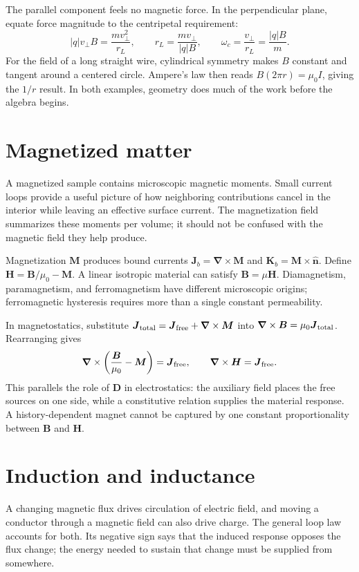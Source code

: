 \documentclass[11pt,oneside]{book}
\newcommand{\vect}[1]{\boldsymbol{#1}}
\newcommand{\grad}{\boldsymbol{\nabla}}
\newcommand{\mun}{\mu_0}
\theoremstyle{reviewstyle}
\begin{document}
The parallel component feels no magnetic force. In the perpendicular plane, equate force magnitude to the centripetal requirement:
\begin{equation}
|q|v_\perp B=\frac{mv_\perp^2}{r_L},\qquad
r_L=\frac{mv_\perp}{|q|B},\qquad
\omega_c=\frac{v_\perp}{r_L}=\frac{|q|B}{m}.
\end{equation}
For the field of a long straight wire, cylindrical symmetry makes $B$ constant and tangent around a centered circle. Ampere's law then reads $B(2\pi r)=\mun I$, giving the $1/r$ result. In both examples, geometry does much of the work before the algebra begins.

\section{Magnetized matter}
A magnetized sample contains microscopic magnetic moments. Small current loops provide a useful picture of how neighboring contributions cancel in the interior while leaving an effective surface current. The magnetization field summarizes these moments per volume; it should not be confused with the magnetic field they help produce.

Magnetization $\vect M$ produces bound currents $\vect J_b=\grad\times\vect M$ and $\vect K_b=\vect M\times\hat{\vect n}$. Define $\vect H=\vect B/\mun-\vect M$. A linear isotropic material can satisfy $\vect B=\mu\vect H$. Diamagnetism, paramagnetism, and ferromagnetism have different microscopic origins; ferromagnetic hysteresis requires more than a single constant permeability.

In magnetostatics, substitute $\vect J_{\rm total}=\vect J_{\rm free}+\grad\times\vect M$ into $\grad\times\vect B=\mun\vect J_{\rm total}$. Rearranging gives
\begin{equation}
\grad\times\left(\frac{\vect B}{\mun}-\vect M\right)=\vect J_{\rm free},
\qquad \grad\times\vect H=\vect J_{\rm free}.
\end{equation}
This parallels the role of $\vect D$ in electrostatics: the auxiliary field places the free sources on one side, while a constitutive relation supplies the material response. A history-dependent magnet cannot be captured by one constant proportionality between $\vect B$ and $\vect H$.

\section{Induction and inductance}
A changing magnetic flux drives circulation of electric field, and moving a conductor through a magnetic field can also drive charge. The general loop law accounts for both. Its negative sign says that the induced response opposes the flux change; the energy needed to sustain that change must be supplied from somewhere.
\end{document}
